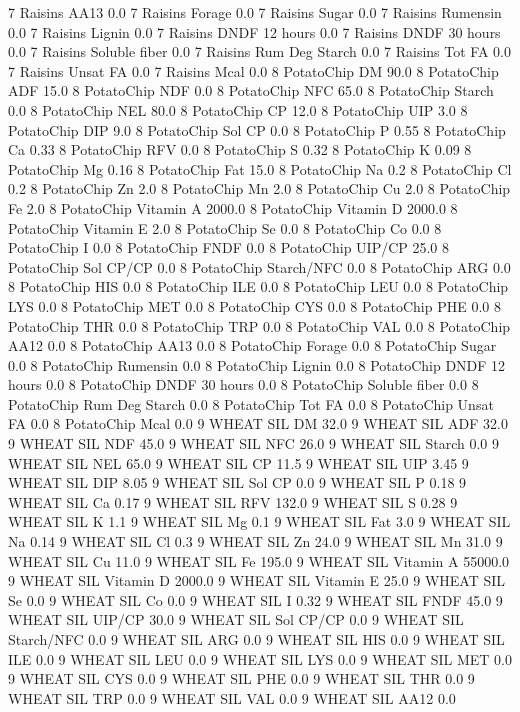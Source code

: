 \documentclass[letterpaper,10pt,english]{sphinxmanual}
\begin{document}
\begin{sphinxVerbatim}[commandchars=\\\{\},numbers=left,firstnumber=1,stepnumber=1]
7 Raisins AA\PYGZsh{}13 0.0
7 Raisins \PYGZpc{} Forage 0.0
7 Raisins Sugar \PYGZpc{} 0.0
7 Raisins Rumensin 0.0
7 Raisins Lignin 0.0
7 Raisins DNDF 12 hours 0.0
7 Raisins DNDF 30 hours 0.0
7 Raisins Soluble fiber 0.0
7 Raisins Rum Deg Starch 0.0
7 Raisins Tot FA 0.0
7 Raisins Unsat FA 0.0
7 Raisins Mcal 0.0
8 PotatoChip DM 90.0
8 PotatoChip ADF 15.0
8 PotatoChip NDF 0.0
8 PotatoChip NFC 65.0
8 PotatoChip Starch 0.0
8 PotatoChip NEL 80.0
8 PotatoChip CP 12.0
8 PotatoChip UIP 3.0
8 PotatoChip DIP 9.0
8 PotatoChip Sol CP 0.0
8 PotatoChip P 0.55
8 PotatoChip Ca 0.33
8 PotatoChip RFV 0.0
8 PotatoChip S 0.32
8 PotatoChip K 0.09
8 PotatoChip Mg 0.16
8 PotatoChip Fat 15.0
8 PotatoChip Na 0.2
8 PotatoChip Cl 0.2
8 PotatoChip Zn 2.0
8 PotatoChip Mn 2.0
8 PotatoChip Cu 2.0
8 PotatoChip Fe 2.0
8 PotatoChip Vitamin A 2000.0
8 PotatoChip Vitamin D 2000.0
8 PotatoChip Vitamin E 2.0
8 PotatoChip Se 0.0
8 PotatoChip Co 0.0
8 PotatoChip I 0.0
8 PotatoChip FNDF 0.0
8 PotatoChip UIP/CP 25.0
8 PotatoChip Sol CP/CP 0.0
8 PotatoChip Starch/NFC 0.0
8 PotatoChip ARG 0.0
8 PotatoChip HIS 0.0
8 PotatoChip ILE 0.0
8 PotatoChip LEU 0.0
8 PotatoChip LYS 0.0
8 PotatoChip MET 0.0
8 PotatoChip CYS 0.0
8 PotatoChip PHE 0.0
8 PotatoChip THR 0.0
8 PotatoChip TRP 0.0
8 PotatoChip VAL 0.0
8 PotatoChip AA\PYGZsh{}12 0.0
8 PotatoChip AA\PYGZsh{}13 0.0
8 PotatoChip \PYGZpc{} Forage 0.0
8 PotatoChip Sugar \PYGZpc{} 0.0
8 PotatoChip Rumensin 0.0
8 PotatoChip Lignin 0.0
8 PotatoChip DNDF 12 hours 0.0
8 PotatoChip DNDF 30 hours 0.0
8 PotatoChip Soluble fiber 0.0
8 PotatoChip Rum Deg Starch 0.0
8 PotatoChip Tot FA 0.0
8 PotatoChip Unsat FA 0.0
8 PotatoChip Mcal 0.0
9 WHEAT SIL DM 32.0
9 WHEAT SIL ADF 32.0
9 WHEAT SIL NDF 45.0
9 WHEAT SIL NFC 26.0
9 WHEAT SIL Starch 0.0
9 WHEAT SIL NEL 65.0
9 WHEAT SIL CP 11.5
9 WHEAT SIL UIP 3.45
9 WHEAT SIL DIP 8.05
9 WHEAT SIL Sol CP 0.0
9 WHEAT SIL P 0.18
9 WHEAT SIL Ca 0.17
9 WHEAT SIL RFV 132.0
9 WHEAT SIL S 0.28
9 WHEAT SIL K 1.1
9 WHEAT SIL Mg 0.1
9 WHEAT SIL Fat 3.0
9 WHEAT SIL Na 0.14
9 WHEAT SIL Cl 0.3
9 WHEAT SIL Zn 24.0
9 WHEAT SIL Mn 31.0
9 WHEAT SIL Cu 11.0
9 WHEAT SIL Fe 195.0
9 WHEAT SIL Vitamin A 55000.0
9 WHEAT SIL Vitamin D 2000.0
9 WHEAT SIL Vitamin E 25.0
9 WHEAT SIL Se 0.0
9 WHEAT SIL Co 0.0
9 WHEAT SIL I 0.32
9 WHEAT SIL FNDF 45.0
9 WHEAT SIL UIP/CP 30.0
9 WHEAT SIL Sol CP/CP 0.0
9 WHEAT SIL Starch/NFC 0.0
9 WHEAT SIL ARG 0.0
9 WHEAT SIL HIS 0.0
9 WHEAT SIL ILE 0.0
9 WHEAT SIL LEU 0.0
9 WHEAT SIL LYS 0.0
9 WHEAT SIL MET 0.0
9 WHEAT SIL CYS 0.0
9 WHEAT SIL PHE 0.0
9 WHEAT SIL THR 0.0
9 WHEAT SIL TRP 0.0
9 WHEAT SIL VAL 0.0
9 WHEAT SIL AA\PYGZsh{}12 0.0

\end{sphinxVerbatim}
\end{document}
